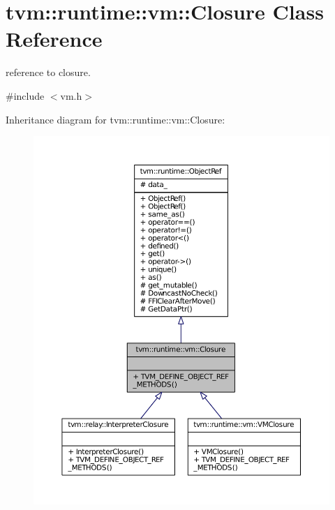 \hypertarget{classtvm_1_1runtime_1_1vm_1_1Closure}{}\section{tvm\+:\+:runtime\+:\+:vm\+:\+:Closure Class Reference}
\label{classtvm_1_1runtime_1_1vm_1_1Closure}


reference to closure.  




{\ttfamily \#include $<$vm.\+h$>$}



Inheritance diagram for tvm\+:\+:runtime\+:\+:vm\+:\+:Closure\+:
\nopagebreak
\begin{figure}[H]
\begin{center}
\leavevmode
\includegraphics[width=350pt]{classtvm_1_1runtime_1_1vm_1_1Closure__inherit__graph}
\end{center}
\end{figure}


